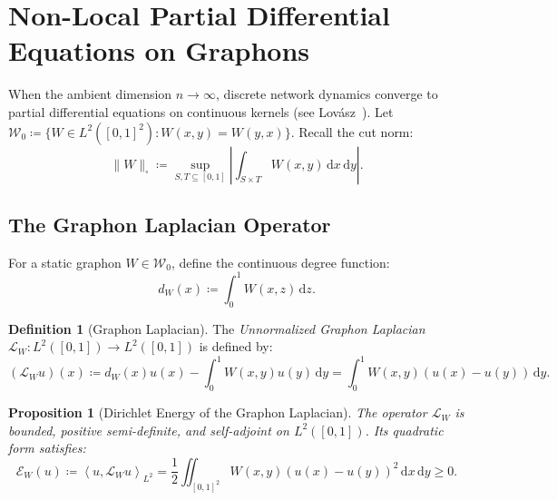 \documentclass[11pt,a4paper,reqno]{amsart}
\newtheorem{proposition}[theorem]{Proposition}
\theoremstyle{definition}
\newtheorem{definition}[theorem]{Definition}
\numberwithin{equation}{section}
\providecommand{\cutnorm}[1]{\|#1\|_{\square}}
\newcommand{\inner}[2]{\left\langle #1, #2 \right\rangle}
\newcommand{\dif}{\,\mathrm{d}}
\providecommand{\cutnorm}[1]{\|#1\|_{\square}}
\begin{document}
\section{Non-Local Partial Differential Equations on Graphons}
\label{sec:graphon_pdes}

When the ambient dimension $n \to \infty$, discrete network dynamics converge to partial differential equations on continuous kernels (see Lov\'asz~\cite{lovasz2012large}). Let $\mathcal{W}_0 \coloneqq \{W \in L^2([0, 1]^2) \colon W(x, y) = W(y, x)\}$. Recall the cut norm:
\begin{equation}
    \label{eq:cut_norm_def_paper2}
    \cutnorm{W} \coloneqq \sup_{S, T \subseteq [0, 1]} \left| \int_{S \times T} W(x, y) \dif x \dif y \right|.
\end{equation}

\subsection{The Graphon Laplacian Operator}
For a static graphon $W \in \mathcal{W}_0$, define the continuous degree function:
\begin{equation}
    d_W(x) \coloneqq \int_0^1 W(x, z) \dif z.
\end{equation}

\begin{definition}[Graphon Laplacian]
The \emph{Unnormalized Graphon Laplacian} $\mathcal{L}_W \colon L^2([0, 1]) \to L^2([0, 1])$ is defined by:
\begin{equation}
    \label{eq:graphon_laplacian}
    (\mathcal{L}_W u)(x) \coloneqq d_W(x) u(x) - \int_0^1 W(x, y) u(y) \dif y = \int_0^1 W(x, y)(u(x) - u(y)) \dif y.
\end{equation}
\end{definition}

\begin{proposition}[Dirichlet Energy of the Graphon Laplacian]
The operator $\mathcal{L}_W$ is bounded, positive semi-definite, and self-adjoint on $L^2([0, 1])$. Its quadratic form satisfies:
\begin{equation}
    \label{eq:graphon_dirichlet}
    \mathcal{E}_W(u) \coloneqq \inner{u}{\mathcal{L}_W u}_{L^2} = \frac{1}{2} \iint_{[0,1]^2} W(x, y) (u(x) - u(y))^2 \dif x \dif y \ge 0.
\end{equation}
\end{proposition}
\end{document}
